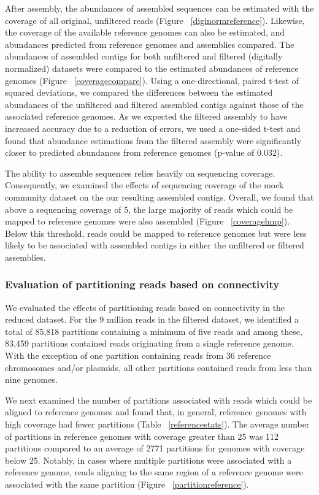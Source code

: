\documentclass[11pt]{article} %
\begin{document}
After assembly, the abundances of assembled sequences can be estimated with the coverage of all original, unfiltered reads (Figure ~\ref{diginormreference}).   Likewise, the coverage of the available reference genomes can also be estimated, and abundances predicted from reference genomes and assemblies compared.  The abundances of assembled contigs for both unfiltered and filtered (digitally normalized) datasets were compared to the estimated abundances of reference genomes (Figure ~\ref{coveragecompare}).  Using a one-directional, paired t-test of squared deviations, we compared the differences between the estimated abundances of the unfiltered and filtered assembled contigs against those of the associated reference genomes.  As we expected the filtered assembly to have increased accuracy due to a reduction of errors, we used a one-sided t-test and found that abundance estimations from the filtered assembly were significantly closer to predicted abundances from reference genomes (p-value of 0.032).  

The ability to assemble sequences relies heavily on sequencing coverage.  Consequently, we examined the effects of sequencing coverage of the mock community dataset on the our resulting assembled contigs.  Overall, we found that above a sequencing coverage of 5, the large majority of reads which could be mapped to reference genomes were also assembled (Figure ~\ref{coveragehmp}).  Below this threshold, reads could be mapped to reference genomes but were less likely to be associated with assembled contigs in either the unfiltered or filtered assemblies.   

\subsubsection{Evaluation of partitioning reads based on connectivity}
We evaluated the effects of partitioning reads based on connectivity in the reduced dataset.  For the 9 million reads in the filtered dataset, we identified a total of 85,818 partitions containing a minimum of five reads and among these, 83,459 partitions contained reads originating from a single reference genome.  With the exception of one partition containing reads from 36 reference chromosomes and/or plasmids, all other partitions contained reads from less than nine genomes.  

We next examined the number of partitions associated with reads which could be aligned to reference genomes and found that, in general, reference genomes with high coverage had fewer partitions (Table ~\ref{referencestats}).  The average number of partitions in reference genomes with coverage greater than 25 was 112 partitions compared to an average of 2771 partitions for genomes with coverage below 25.  Notably, in cases where multiple partitions were associated with a reference genome, reads aligning to the same region of a reference genome were associated with the same partition (Figure ~\ref{partitionreference}).
\end{document}
